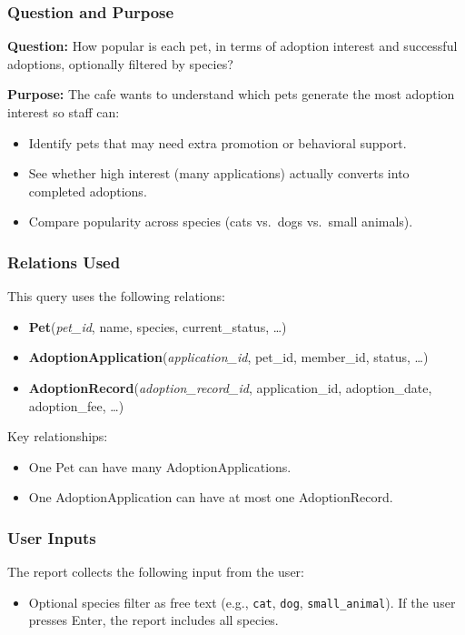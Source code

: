 \documentclass[11pt]{article}
\begin{document}
\subsubsection{Question and Purpose}

\textbf{Question:}  
How popular is each pet, in terms of adoption interest and successful adoptions,
optionally filtered by species?

\textbf{Purpose:}  
The cafe wants to understand which pets generate the most adoption interest so
staff can:
\begin{itemize}
    \item Identify pets that may need extra promotion or behavioral support.
    \item See whether high interest (many applications) actually converts into
          completed adoptions.
    \item Compare popularity across species (cats vs.\ dogs vs.\ small animals).
\end{itemize}

\subsubsection{Relations Used}

This query uses the following relations:
\begin{itemize}
    \item \textbf{Pet}(\textit{pet\_id}, name, species, current\_status, \dots)
    \item \textbf{AdoptionApplication}(\textit{application\_id}, pet\_id, member\_id, status, \dots)
    \item \textbf{AdoptionRecord}(\textit{adoption\_record\_id}, application\_id, adoption\_date, adoption\_fee, \dots)
\end{itemize}

\noindent
Key relationships:
\begin{itemize}
    \item One Pet can have many AdoptionApplications.
    \item One AdoptionApplication can have at most one AdoptionRecord.
\end{itemize}

\subsubsection{User Inputs}

The report collects the following input from the user:
\begin{itemize}
    \item Optional species filter as free text (e.g., \texttt{cat}, \texttt{dog}, \texttt{small\_animal}).  
          If the user presses Enter, the report includes all species.
\end{itemize}
\end{document}
